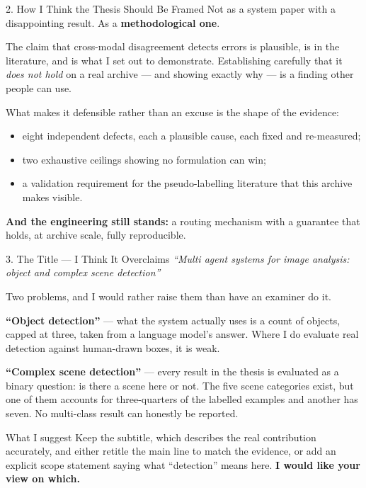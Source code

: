 \documentclass[aspectratio=169,11pt]{beamer}
\begin{document}
\begin{frame}{2. How I Think the Thesis Should Be Framed}
\small
Not as a system paper with a disappointing result. As a \textbf{methodological one}.
\vspace{2mm}

\small
The claim that cross-modal disagreement detects errors is plausible, is in the literature, and is what I set out to demonstrate. Establishing carefully that it \emph{does not hold} on a real archive --- and showing exactly why --- is a finding other people can use.
\vspace{2mm}

What makes it defensible rather than an excuse is the shape of the evidence:
\vspace{2mm}
\begin{itemize}
  \setlength\itemsep{1mm}
  \item eight independent defects, each a plausible cause, each fixed and re-measured;
  \item two exhaustive ceilings showing no formulation can win;
  \item a validation requirement for the pseudo-labelling literature that this archive makes visible.
\end{itemize}
\vspace{1.5mm}

\textbf{And the engineering still stands:} a routing mechanism with a guarantee that holds, at archive scale, fully reproducible.
\end{frame}

\begin{frame}{3. The Title --- I Think It Overclaims}
\small
\emph{``Multi agent systems for image analysis: object and complex scene detection''}
\vspace{2mm}

\small
Two problems, and I would rather raise them than have an examiner do it.
\vspace{1.5mm}

\textbf{``Object detection''} --- what the system actually uses is a count of objects, capped at three, taken from a language model's answer. Where I do evaluate real detection against human-drawn boxes, it is weak.
\vspace{1.5mm}

\textbf{``Complex scene detection''} --- every result in the thesis is evaluated as a binary question: is there a scene here or not. The five scene categories exist, but one of them accounts for three-quarters of the labelled examples and another has seven. No multi-class result can honestly be reported.
\vspace{2mm}

\begin{block}{\small What I suggest}
Keep the subtitle, which describes the real contribution accurately, and either retitle the main line to match the evidence, or add an explicit scope statement saying what ``detection'' means here. \textbf{I would like your view on which.}
\end{block}
\end{frame}
\end{document}
